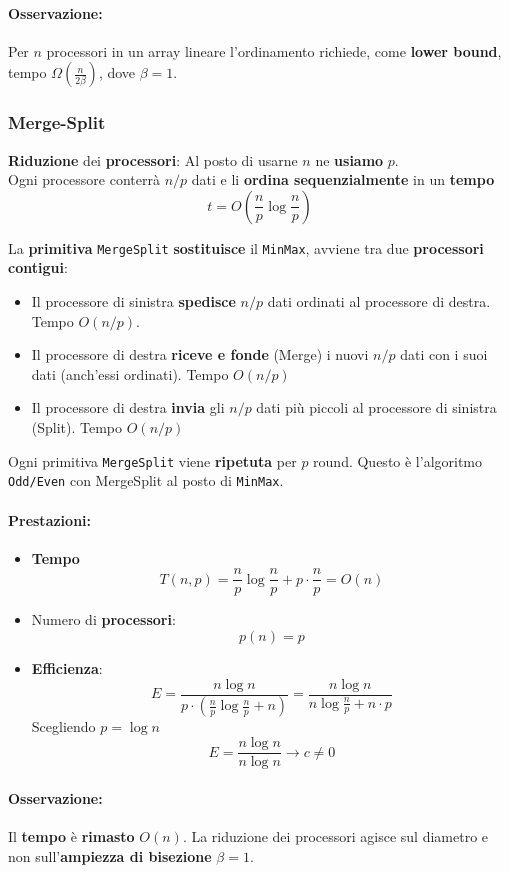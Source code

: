 \paragraph{Osservazione:} Per $n$ processori in un array lineare l'ordinamento richiede, come \textbf{lower bound}, tempo $\Omega \left(\frac{n}{2 \beta}\right)$, dove $\beta = 1$.\\

\newpage

\subsubsection{Merge-Split}

\textbf{Riduzione} dei \textbf{processori}: Al posto di usarne $n$ ne \textbf{usiamo} $p$.\\

Ogni processore conterrà $n/p$ dati e li \textbf{ordina sequenzialmente} in un \textbf{tempo} 
$$ t = O\left(\frac{n}{p} \log \frac{n}{p} \right)$$

La \textbf{primitiva} \texttt{MergeSplit} \textbf{sostituisce} il \texttt{MinMax}, avviene tra due \textbf{processori contigui}: 
\begin{itemize}
	\item Il processore di sinistra \textbf{spedisce} $n/p$ dati ordinati al processore di destra. Tempo $O(n/p)$.
	\item Il processore di destra \textbf{riceve e fonde} (Merge) i nuovi $n/p$ dati con i suoi dati (anch'essi ordinati). Tempo $O(n/p)$
	\item Il processore di destra \textbf{invia} gli $n/p$ dati più piccoli al processore di sinistra (Split). Tempo $O(n/p)$
\end{itemize}

Ogni primitiva \texttt{MergeSplit} viene \textbf{ripetuta} per $p$ round. Questo è l'algoritmo \texttt{Odd/Even} con MergeSplit al posto di \texttt{MinMax}.\\

\paragraph{Prestazioni: }
\begin{itemize}
	\item \textbf{Tempo }
	$$ T(n,p) = \frac{n}{p} \log \frac{n}{p} + p \cdot \frac{n}{p} = O(n) $$
	\item Numero di \textbf{processori}: 
	$$ p(n) = p $$
	\item \textbf{Efficienza}:
	$$ E = \frac{n \log n}{p \cdot \left(\frac{n}{p} \log \frac{n}{p} + n\right)} = \frac{n \log n}{ n \log \frac{n}{p} + n \cdot p} $$
	Scegliendo $p = \log n$
	$$ E = \frac{n \log n}{n \log n} \rightarrow c \neq 0 $$
\end{itemize}

\paragraph{Osservazione:} Il \textbf{tempo} è \textbf{rimasto} $O(n)$. La riduzione dei processori agisce sul diametro e non sull'\textbf{ampiezza di bisezione} $\beta = 1$.\\


